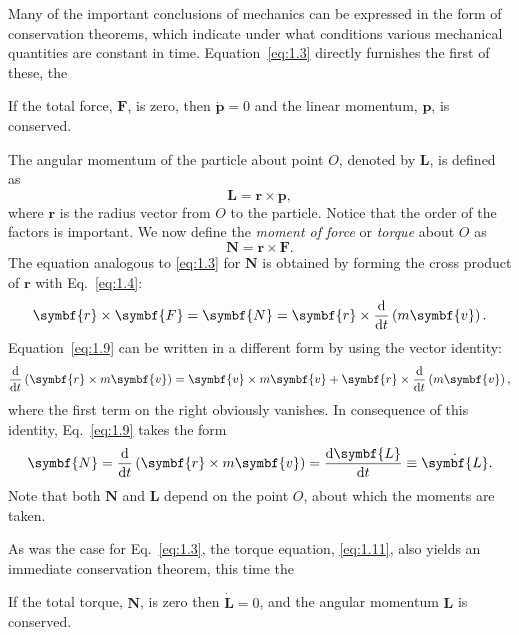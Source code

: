 Many of the important conclusions of mechanics can be expressed in the form of conservation theorems, which indicate under what conditions various mechanical quantities are constant in time. Equation~\eqref{eq:1.3} directly furnishes the first of these, the
\begin{theorem}
    If the total force, \(\symbf{F}\), is zero, then \(\dot{\symbf{p}}=0\) and the linear momentum, \(\symbf{p}\), is conserved.
\end{theorem}

The angular momentum of the particle about point \(O\), denoted by \(\symbf{L}\), is defined as
\begin{equation}
    \symbf{L}=\symbf{r}\times\symbf{p},
\end{equation}
where \(\symbf{r}\) is the radius vector from \(O\) to the particle. Notice that the order of the factors is important. We now define the \emph{moment of force} or \emph{torque} about \(O\) as
\begin{equation}
    \symbf{N}=\symbf{r}\times\symbf{F}.
\end{equation}
The equation analogous to \eqref{eq:1.3} for \(\symbf{N}\) is obtained by forming the cross product of \(\symbf{r}\) with Eq.~\eqref{eq:1.4}:
\begin{equation}
    \symbf{r}\times\symbf{F}=\symbf{N}=\symbf{r}\times\odv*{\left(m\symbf{v}\right)}{t}.\label{eq:1.9}
\end{equation}
Equation~\eqref{eq:1.9} can be written in a different form by using the vector identity:
\begin{equation}
    \odv*{\left(\symbf{r}\times m\symbf{v}\right)}{t}=\symbf{v}\times m\symbf{v}+\symbf{r}\times\odv*{\left(m\symbf{v}\right)}{t},\label{eq:1.10}
\end{equation}
where the first term on the right obviously vanishes. In consequence of this identity, Eq.~\eqref{eq:1.9} takes the form
\begin{equation}
    \symbf{N}=\odv*{\left(\symbf{r}\times m\symbf{v}\right)}{t}=\odv{\symbf{L}}{t}\equiv\dot{\symbf{L}}.\label{eq:1.11}
\end{equation}
Note that both \(\symbf{N}\) and \(\symbf{L}\) depend on the point \(O\), about which the moments are taken.

As was the case for Eq.~\eqref{eq:1.3}, the torque equation, \eqref{eq:1.11}, also yields an immediate conservation theorem, this time the
\begin{theorem}
    If the total torque, \(\symbf{N}\), is zero then \(\dot{\symbf{L}}=0\), and the angular momentum \(\symbf{L}\) is conserved.
\end{theorem}

